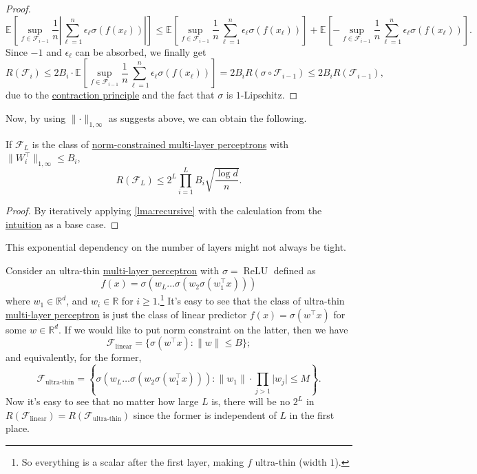 \begin{proof}
	\[
		\mathbb{E}_{}\left[ \sup _{f\in \mathscr{F} _{i-1}} \frac{1}{n} \left\vert \sum_{\ell = 1}^{n} \epsilon _{\ell } \sigma (f(x_{\ell })) \right\vert \right]
		\leq \mathbb{E}_{}\left[\sup _{f\in \mathscr{F} _{i-1}} \frac{1}{n} \sum_{\ell = 1}^{n} \epsilon _{\ell } \sigma (f(x_{\ell })) \right] + \mathbb{E}_{}\left[-\sup _{f\in \mathscr{F} _{i-1}} \frac{1}{n} \sum_{\ell = 1}^{n} \epsilon _{\ell } \sigma (f(x_{\ell })) \right] .
	\]
	Since \(-1\) and \(\epsilon _{\ell }\) can be absorbed, we finally get
	\[
		R(\mathscr{F} _i)
		\leq 2 B_i \cdot \mathbb{E}_{}\left[\sup _{f\in \mathscr{F} _{i-1}} \frac{1}{n} \sum_{\ell = 1}^{n} \epsilon _{\ell } \sigma (f(x_{\ell })) \right]
		= 2 B_i R(\sigma \circ \mathscr{F} _{i-1})
		\leq 2 B_i R(\mathscr{F} _{i-1}),
	\]
	due to the \hyperref[thm:contraction-principle]{contraction principle} and the fact that \(\sigma \) is \(1\)-Lipschitz.
\end{proof}

Now, by using \(\lVert \cdot \rVert _{1, \infty }\) as suggests above, we can obtain the following.

\begin{corollary}
	If \(\mathscr{F} _L\) is the class of \hyperref[def:norm-MLP]{norm-constrained multi-layer perceptrons} with \(\lVert W_i ^{\top} \rVert _{1, \infty } \leq B_i\),
	\[
		R(\mathscr{F} _L) \leq 2^L \prod _{i=1}^{L} B_i \sqrt{\frac{\log d}{n}} .
	\]
\end{corollary}
\begin{proof}
	By iteratively applying \autoref{lma:recursive} with the calculation from the \hyperref[int:recursive]{intuition} as a base case.
\end{proof}

This exponential dependency on the number of layers might not always be tight.

\begin{eg}
	Consider an ultra-thin \hyperref[def:MLP]{multi-layer perceptron} with \(\sigma = \operatorname{ReLU}\) defined as
	\[
		f(x) = \sigma (w_L \dots \sigma (w_2 \sigma (w_1 ^{\top} x)))
	\]
	where \(w_1 \in \mathbb{R} ^d\), and \(w_i \in \mathbb{R} \) for \(i \geq 1\).\footnote{So everything is a scalar after the first layer, making \(f\) ultra-thin (width \(1\)).} It's easy to see that the class of ultra-thin \hyperref[def:MLP]{multi-layer perceptron} is just the class of linear predictor \(f(x) = \sigma (w^{\top} x)\) for some \(w\in \mathbb{R} ^d\). If we would like to put norm constraint on the latter, then we have
	\[
		\mathscr{F} _{\text{linear} } = \{ \sigma (w^{\top} x) \colon \lVert w \rVert \leq B \} ;
	\]
	and equivalently, for the former,
	\[
		\mathscr{F} _{\text{ultra-thin} } = \left\{ \sigma (w_L \dots \sigma (w_2 \sigma (w_1 ^{\top} x))) \colon \lVert w_1 \rVert \cdot \prod _{j > 1} \vert w_j \vert \leq M \right\} .
	\]
	Now it's easy to see that no matter how large \(L\) is, there will be no \(2^L\) in \(R(\mathscr{F} _{\text{linear} }) = R(\mathscr{F} _{\text{ultra-thin} })\) since the former is independent of \(L\) in the first place.
\end{eg}


